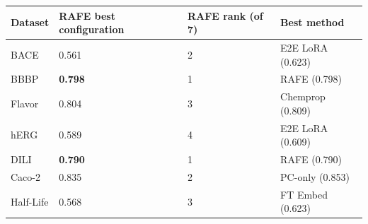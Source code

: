 \begin{tabular}{llll}
\toprule
Dataset & RAFE best configuration & RAFE rank (of 7) & Best method \\
\midrule
BACE & 0.561 & 2 & E2E LoRA (0.623) \\
BBBP & \textbf{0.798} & 1 & RAFE (0.798) \\
Flavor & 0.804 & 3 & Chemprop (0.809) \\
hERG & 0.589 & 4 & E2E LoRA (0.609) \\
DILI & \textbf{0.790} & 1 & RAFE (0.790) \\
Caco-2 & 0.835 & 2 & PC-only (0.853) \\
Half-Life & 0.568 & 3 & FT Embed (0.623) \\
\bottomrule
\end{tabular}
